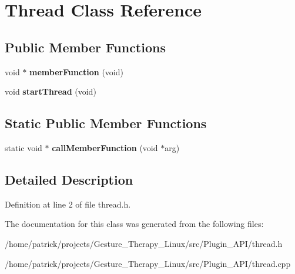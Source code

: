 \hypertarget{class_thread}{}\section{Thread Class Reference}
\label{class_thread}
\subsection*{Public Member Functions}
\begin{DoxyCompactItemize}
\item 
\mbox{\label{class_thread_aa2132343300568b671cddcb5816dafc8}} 
void $\ast$ {\bfseries member\+Function} (void)
\item 
\mbox{\label{class_thread_ad4ec138a1bb5b3bbe328267185720198}} 
void {\bfseries start\+Thread} (void)
\end{DoxyCompactItemize}
\subsection*{Static Public Member Functions}
\begin{DoxyCompactItemize}
\item 
\mbox{\label{class_thread_a89d99192bd58b8199b84a530842174fb}} 
static void $\ast$ {\bfseries call\+Member\+Function} (void $\ast$arg)
\end{DoxyCompactItemize}


\subsection{Detailed Description}


Definition at line 2 of file thread.\+h.



The documentation for this class was generated from the following files\+:\begin{DoxyCompactItemize}
\item 
/home/patrick/projects/\+Gesture\+\_\+\+Therapy\+\_\+\+Linux/src/\+Plugin\+\_\+\+A\+P\+I/thread.\+h\item 
/home/patrick/projects/\+Gesture\+\_\+\+Therapy\+\_\+\+Linux/src/\+Plugin\+\_\+\+A\+P\+I/thread.\+cpp\end{DoxyCompactItemize}
